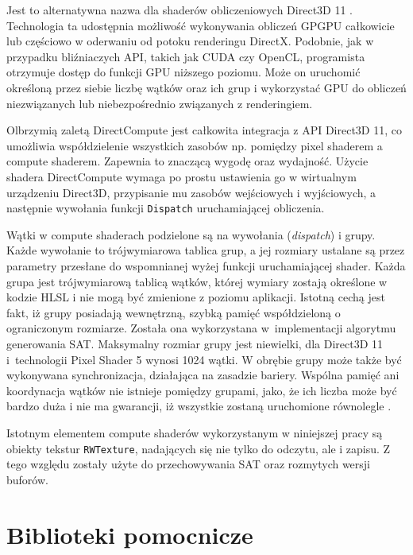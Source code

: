 	
	Jest to alternatywna nazwa dla shaderów obliczeniowych Direct3D 11 \cite{tech01}. Technologia ta udostępnia możliwość wykonywania obliczeń GPGPU całkowicie lub częściowo w oderwaniu od potoku renderingu DirectX. Podobnie, jak w przypadku bliźniaczych API, takich jak CUDA czy OpenCL, programista otrzymuje dostęp do funkcji GPU niższego poziomu. Może on uruchomić określoną przez siebie liczbę wątków oraz ich grup i wykorzystać GPU do obliczeń niezwiązanych lub niebezpośrednio związanych z renderingiem.
	
	Olbrzymią zaletą DirectCompute jest całkowita integracja z API Direct3D 11, co umożliwia współdzielenie wszystkich zasobów np. pomiędzy pixel shaderem a compute shaderem. Zapewnia to znaczącą wygodę oraz wydajność. Użycie shadera DirectCompute wymaga po prostu ustawienia go w wirtualnym urządzeniu Direct3D, przypisanie mu zasobów wejściowych i wyjściowych, a następnie wywołania funkcji \texttt{Dispatch} uruchamiającej obliczenia.
	
	Wątki w compute shaderach podzielone są na wywołania (\textit{dispatch}) i grupy. Każde wywołanie to trójwymiarowa tablica grup, a jej rozmiary ustalane są przez parametry przesłane do wspomnianej wyżej funkcji uruchamiającej shader. Każda grupa jest trójwymiarową tablicą wątków, której wymiary zostają określone w kodzie HLSL i nie mogą być zmienione z poziomu aplikacji. Istotną cechą jest fakt, iż grupy posiadają wewnętrzną, szybką pamięć współdzieloną o ograniczonym rozmiarze. Została ona wykorzystana w~implementacji algorytmu generowania SAT. Maksymalny rozmiar grupy jest niewielki, dla Direct3D 11 i~technologii Pixel Shader 5 wynosi 1024 wątki. W obrębie grupy może także być wykonywana synchronizacja, działająca na zasadzie bariery. Wspólna pamięć ani koordynacja wątków nie istnieje pomiędzy grupami, jako, że ich liczba może być bardzo duża i nie ma gwarancji, iż wszystkie zostaną uruchomione równolegle \cite{directcompute}.
	
	Istotnym elementem compute shaderów wykorzystanym w niniejszej pracy są obiekty tekstur \texttt{RWTexture}, nadających się nie tylko do odczytu, ale i zapisu. Z tego względu zostały użyte do przechowywania SAT oraz rozmytych wersji buforów.
	
	\section{Biblioteki pomocnicze}
	\label{t:technologie:helpers}
	
